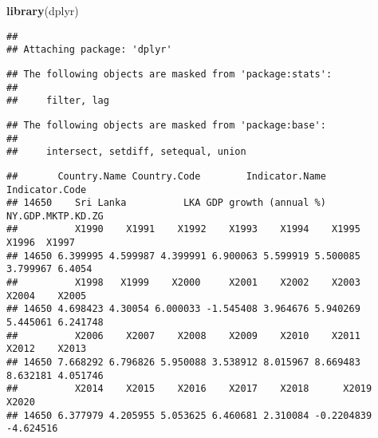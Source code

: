 \documentclass[
]{article}
\newenvironment{Shaded}{\begin{snugshade}}{\end{snugshade}}
\newcommand{\CommentTok}[1]{\textcolor[rgb]{0.56,0.35,0.01}{\textit{#1}}}
\newcommand{\FunctionTok}[1]{\textcolor[rgb]{0.13,0.29,0.53}{\textbf{#1}}}
\newcommand{\NormalTok}[1]{#1}
\newcommand{\OtherTok}[1]{\textcolor[rgb]{0.56,0.35,0.01}{#1}}
\newcommand{\SpecialCharTok}[1]{\textcolor[rgb]{0.81,0.36,0.00}{\textbf{#1}}}
\newcommand{\StringTok}[1]{\textcolor[rgb]{0.31,0.60,0.02}{#1}}
\begin{document}
\begin{Shaded}
\begin{Highlighting}[]
\FunctionTok{library}\NormalTok{(dplyr)}
\end{Highlighting}
\end{Shaded}

\begin{verbatim}
## 
## Attaching package: 'dplyr'
\end{verbatim}

\begin{verbatim}
## The following objects are masked from 'package:stats':
## 
##     filter, lag
\end{verbatim}

\begin{verbatim}
## The following objects are masked from 'package:base':
## 
##     intersect, setdiff, setequal, union
\end{verbatim}

\begin{Shaded}
\end{Shaded}

\begin{verbatim}
##       Country.Name Country.Code        Indicator.Name    Indicator.Code
## 14650    Sri Lanka          LKA GDP growth (annual %) NY.GDP.MKTP.KD.ZG
##          X1990    X1991    X1992    X1993    X1994    X1995    X1996  X1997
## 14650 6.399995 4.599987 4.399991 6.900063 5.599919 5.500085 3.799967 6.4054
##          X1998   X1999    X2000     X2001    X2002    X2003    X2004    X2005
## 14650 4.698423 4.30054 6.000033 -1.545408 3.964676 5.940269 5.445061 6.241748
##          X2006    X2007    X2008    X2009    X2010    X2011    X2012    X2013
## 14650 7.668292 6.796826 5.950088 3.538912 8.015967 8.669483 8.632181 4.051746
##          X2014    X2015    X2016    X2017    X2018      X2019     X2020
## 14650 6.377979 4.205955 5.053625 6.460681 2.310084 -0.2204839 -4.624516
\end{verbatim}
\end{document}
